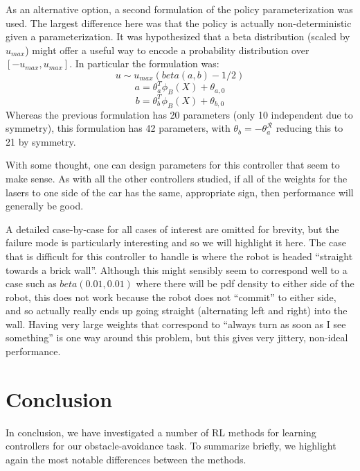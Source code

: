 \documentclass{article}
\begin{document}
As an alternative option, a second formulation of the policy parameterization was used.  The largest difference here was that the policy is actually non-deterministic given a parameterization.  It was hypothesized that a beta distribution (scaled by $u_{max}$) might offer a useful way to encode a probability distribution over $[-u_{max}, u_{max}]$.  In particular the formulation was:
%
%
\begin{equation}
u \sim u_{max}(beta(a,b) - 1/2)
\end{equation}
\begin{equation}
a = \theta_a^T \phi_B(X) + \theta_{a, 0}
\end{equation}
\begin{equation}
b = \theta_b^T \phi_B(X) + \theta_{b, 0}
\end{equation}
%
%
Whereas the previous formulation has 20 parameters (only 10 independent due to symmetry), this formulation has 42 parameters, with $\theta_b = -\theta_a^{\mathcal{R}}$ reducing this to 21 by symmetry.

With some thought, one can design parameters for this controller that seem to make sense.  As with all the other controllers studied, if all of the weights for the lasers to one side of the car has the same, appropriate sign, then performance will generally be good.  

A detailed case-by-case for all cases of interest are omitted for brevity, but the failure mode is particularly interesting and so we will highlight it here.  The case that is difficult for this controller to handle is where the robot is headed ``straight towards a brick wall''.  Although this might sensibly seem to correspond well to a case such as $beta(0.01, 0.01)$ where there will be pdf density to either side of the robot, this does not work because the robot does not ``commit'' to either side, and so actually really ends up going straight (alternating left and right) into the wall.  Having very large weights that correspond to ``always turn as soon as I see something'' is one way around this problem, but this gives very jittery, non-ideal performance.

\section{Conclusion}

In conclusion, we have investigated a number of RL methods for learning controllers for our obstacle-avoidance task.  To summarize briefly, we highlight again the most notable differences between the methods.
\end{document}
